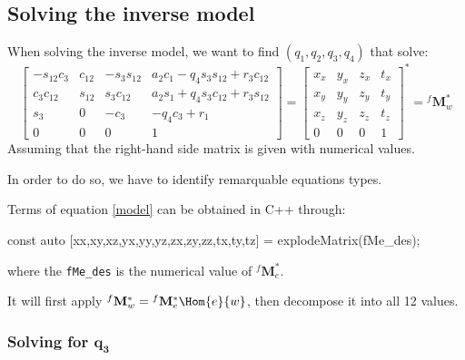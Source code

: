 \documentclass{ecnreport}
\begin{document}
\subsection*{Solving the inverse model}

When solving the inverse model, we want to find $(q_1, q_2, q_3, q_4)$ that solve:\\
\begin{equation} \left[\begin{matrix}- s_{12} c_3 & c_{12} & - s_3 s_{12} & a_{2} c_1 - q_{4} s_3 s_{12} + r_{3} c_{12}\\c_3 c_{12} & s_{12} & s_3 c_{12} & a_{2} s_1 + q_{4} s_3 c_{12} + r_{3} s_{12}\\s_3 & 0 & - c_3 & - q_{4} c_3 + r_{1}\\0 & 0 & 0 & 1\end{matrix}\right] = \left[\begin{matrix}x_x & y_x & z_x & t_x\\x_y & y_y & z_y & t_y\\x_z & y_z & z_z & t_z\\0 & 0 & 0 & 1\end{matrix}\right]^* = {}^f\mathbf{M}_w^*
\label{model}
\end{equation}
Assuming that the right-hand side matrix is given with numerical values.

In order to do so, we have to identify remarquable equations types.

Terms of equation \eqref{model} can be obtained in C++ through:
\begin{cppcode}
 const auto [xx,xy,xz,yx,yy,yz,zx,zy,zz,tx,ty,tz] = explodeMatrix(fMe_des);
\end{cppcode}
where the \texttt{fMe\_des} is the numerical value of ${}^f\mathbf{M}_e^*$.

It will first apply ${}^f\mathbf{M}_w^* = {}^f\mathbf{M}_e^* \Hom{e}{w}$, then decompose it into all 12 values.



\subsubsection*{Solving for $\mathbf{q_3}$}
\end{document}
